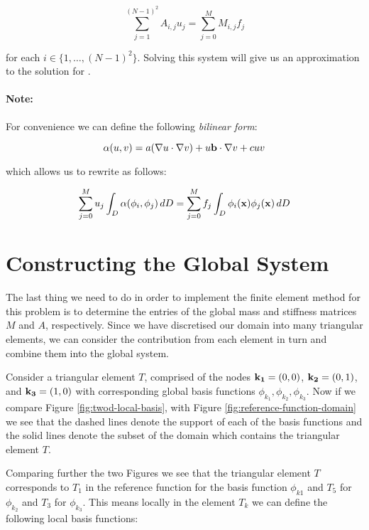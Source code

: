 \begin{equation}
    \sum_{j=1}^{(N-1)^2}A_{i,j}u_j = \sum_{j=0}^MM_{i,j}f_j
\end{equation}

for each $i \in \{1, \ldots, (N-1)^2\}$. Solving this system will give us an
approximation to the solution for .

\paragraph{Note:}

For convenience we can define the following \textit{bilinear form}:

\begin{equation}\label{eq:twod-deterministic-bilinear}
    \alpha(u,v) = a(\nabla u \cdot \nabla v) + u\mathbf{b} \cdot \nabla v
                 + cuv
\end{equation}

which allows us to rewrite  as follows:

\begin{equation}
    \sum_{j = 0}^Mu_j\int_D\alpha(\phi_i,\phi_j)\, dD
        = \sum_{j = 0}^Mf_j\int_D\phi_i(\mathbf{x})\phi_j(\mathbf{x})\, dD
\end{equation}

\section{Constructing the Global System}\label{sec:twod-deterministic-global-system}

The last thing we need to do in order to implement the finite element method
for this problem is to determine the entries of the global mass and stiffness
matrices $M$ and $A$, respectively. Since we have discretised our domain into
many triangular elements, we can consider the contribution from each element
in turn and combine them into the global system.

Consider a triangular element $T$, comprised of the nodes $\mathbf{k_1} = (0,0)$,
$\mathbf{k_2} = (0,1)$, and $\mathbf{k_3} = (1,0)$ with corresponding global basis functions
$\phi_{k_1}, \phi_{k_2}, \phi_{k_3}$. Now if we compare Figure
\ref{fig:twod-local-basis}, with Figure \ref{fig:reference-function-domain}
we see that the dashed lines denote the support of each of the basis functions
and the solid lines denote the subset of the domain which contains the triangular
element $T$.

Comparing further the two Figures we see that the triangular element $T$
corresponds to $T_1$ in the reference function for the basis function $\phi_{k1}$
and $T_5$ for $\phi_{k_2}$ and $T_3$ for $\phi_{k_3}$. This means locally in the
element $T_k$ we can define the following local basis functions:

